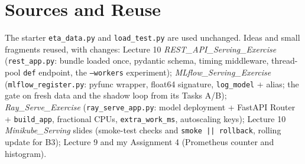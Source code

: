 \documentclass[10pt]{article}
\newcommand{\code}[1]{\texttt{#1}}
\begin{document}
\section{Sources and Reuse}
The starter \code{eta\_data.py} and \code{load\_test.py} are used unchanged. Ideas and small fragments reused, with changes:
Lecture 10 \emph{REST\_API\_Serving\_Exercise} (\code{rest\_app.py}: bundle loaded once, pydantic schema, timing middleware,
thread-pool \code{def} endpoint, the \code{--workers} experiment); \emph{MLflow\_Serving\_Exercise} (\code{mlflow\_register.py}: pyfunc
wrapper, float64 signature, \code{log\_model} + alias; the gate on fresh data and the shadow loop from its Tasks A/B); \emph{Ray\_Serve\_Exercise}
(\code{ray\_serve\_app.py}: model deployment + FastAPI Router + \code{build\_app}, fractional CPUs, \code{extra\_work\_ms}, autoscaling keys);
Lecture 10 \emph{Minikube\_Serving} slides (smoke-test checks and \code{smoke || rollback}, rolling update for B3); Lecture 9 and my
Assignment 4 (Prometheus counter and histogram).
\end{document}
